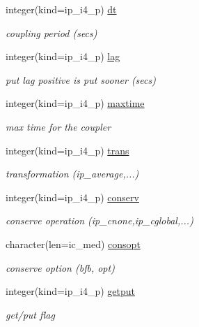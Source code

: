\begin{DoxyCompactItemize}
integer(kind=ip\+\_\+i4\+\_\+p) \hyperlink{structmod__oasis__coupler_1_1prism__coupler__type_ae1c1191f9aa4664aac2b819d1648320d}{dt}
\begin{DoxyCompactList}\small\item\em coupling period (secs) \end{DoxyCompactList}\item 
integer(kind=ip\+\_\+i4\+\_\+p) \hyperlink{structmod__oasis__coupler_1_1prism__coupler__type_a5f95dd90844b18f8c619df9371a556c6}{lag}
\begin{DoxyCompactList}\small\item\em put lag positive is put sooner (secs) \end{DoxyCompactList}\item 
integer(kind=ip\+\_\+i4\+\_\+p) \hyperlink{structmod__oasis__coupler_1_1prism__coupler__type_abe7dd91c4d011f5717e203191b7788e3}{maxtime}
\begin{DoxyCompactList}\small\item\em max time for the coupler \end{DoxyCompactList}\item 
integer(kind=ip\+\_\+i4\+\_\+p) \hyperlink{structmod__oasis__coupler_1_1prism__coupler__type_ad9fad1fec923d4db974f94fd0bca5697}{trans}
\begin{DoxyCompactList}\small\item\em transformation (ip\+\_\+average,...) \end{DoxyCompactList}\item 
integer(kind=ip\+\_\+i4\+\_\+p) \hyperlink{structmod__oasis__coupler_1_1prism__coupler__type_a6ae875acb2785153668c3e773ed9682f}{conserv}
\begin{DoxyCompactList}\small\item\em conserve operation (ip\+\_\+cnone,ip\+\_\+cglobal,...) \end{DoxyCompactList}\item 
character(len=ic\+\_\+med) \hyperlink{structmod__oasis__coupler_1_1prism__coupler__type_ab539821ab680aa56c81cb541c093f50f}{consopt}
\begin{DoxyCompactList}\small\item\em conserve option (bfb, opt) \end{DoxyCompactList}\item 
integer(kind=ip\+\_\+i4\+\_\+p) \hyperlink{structmod__oasis__coupler_1_1prism__coupler__type_a72f8ada57213a9c0e6ab85742c521f86}{getput}
\begin{DoxyCompactList}\small\item\em get/put flag \end{DoxyCompactList}\item 

\end{DoxyCompactItemize}

